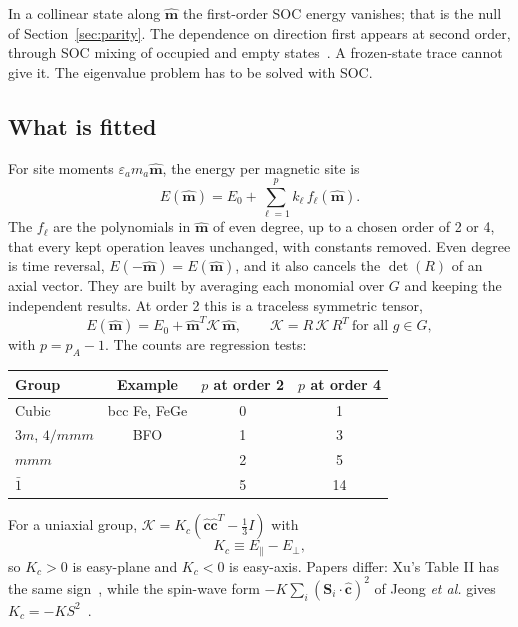 \documentclass[11pt,a4paper]{article}
\numberwithin{equation}{section}
\newcommand{\vct}[1]{\bm{#1}}
\begin{document}
In a collinear state along $\hat{\vct m}$ the first-order SOC energy vanishes;
that is the null of Section~\ref{sec:parity}. The dependence on direction first
appears at second order, through SOC mixing of occupied and empty
states~\cite{heide}. A frozen-state trace cannot give it. The eigenvalue problem
has to be solved with SOC.

\subsection{What is fitted}

For site moments $\varepsilon_am_a\hat{\vct m}$, the energy per magnetic site is
\begin{equation}\label{eq:mca}
 \boxed{E(\hat{\vct m})=E_0+\sum_{\ell=1}^{p}k_\ell\,f_\ell(\hat{\vct m}).}
\end{equation}
The $f_\ell$ are the polynomials in $\hat{\vct m}$ of even degree, up to a
chosen order of 2 or 4, that every kept operation leaves unchanged, with
constants removed. Even degree is time reversal, $E(-\hat{\vct m})=E(\hat{\vct m})$,
and it also cancels the $\det(R)$ of an axial vector. They are built by
averaging each monomial over $G$ and keeping the independent results. At order 2
this is a traceless symmetric tensor,
\begin{equation}\label{eq:ktensor}
 E(\hat{\vct m})=E_0+\hat{\vct m}^T\mathcal K\,\hat{\vct m},
 \qquad \mathcal K=R\,\mathcal K\,R^T\ \text{for all }g\in G,
\end{equation}
with $p=p_A-1$. The counts are regression tests:

\begin{center}
\begin{tabular}{@{}lccc@{}}
\toprule Group & Example & $p$ at order 2 & $p$ at order 4\\\midrule
Cubic & bcc Fe, FeGe & 0 & 1\\
$3m$, $4/mmm$ & BFO & 1 & 3\\
$mmm$ & & 2 & 5\\
$\bar1$ & & 5 & 14\\
\bottomrule
\end{tabular}
\end{center}

For a uniaxial group, $\mathcal K=K_c(\hat{\vct c}\hat{\vct c}^T-\tfrac13I)$ with
\begin{equation}\label{eq:kc}
 K_c\equiv E_\parallel-E_\perp ,
\end{equation}
so $K_c>0$ is easy-plane and $K_c<0$ is easy-axis. Papers differ: Xu's Table II
has the same sign~\cite{xu}, while the spin-wave form
$-K\sum_i(\vct S_i\cdot\hat{\vct c})^2$ of Jeong \emph{et al.} gives
$K_c=-KS^2$~\cite{jeong}.
\end{document}

